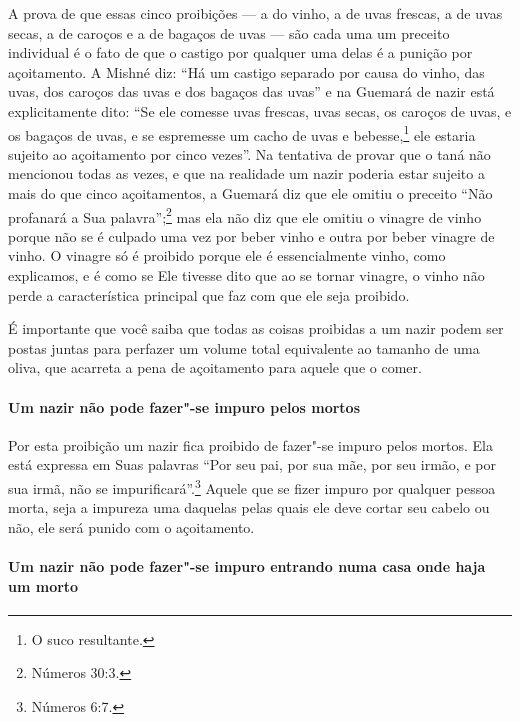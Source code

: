 \begin{multicols}{2}
A prova de que essas cinco proibições --- a do vinho, a de uvas
frescas, a de uvas secas, a de caroços e a de bagaços de uvas --- são
cada uma um preceito individual é o fato de que o castigo por qualquer uma delas é a
punição por açoitamento. A Mishné diz: ``Há um castigo separado por
causa do vinho, das uvas, dos caroços das uvas e dos bagaços das uvas''
e na Guemará\starr{} de nazir\starr{} está explicitamente dito: ``Se ele comesse uvas
frescas, uvas secas, os caroços de uvas, e os bagaços de uvas, e se
espremesse um cacho de uvas e bebesse,\footnote{O suco resultante.} ele estaria
sujeito ao açoitamento por cinco vezes''. Na tentativa de provar que o
taná\starr{} não mencionou todas as vezes, e que na realidade um nazir\starr{}
poderia estar sujeito a mais do que cinco açoitamentos, a Guemará\starr{} diz
que ele omitiu o preceito ``Não profanará a Sua palavra'';\footnote{Números
30:3.} mas ela não diz que ele omitiu o vinagre de vinho porque não se é
culpado uma vez por beber vinho e outra por beber vinagre de vinho. O
vinagre só é proibido porque ele é essencialmente vinho, como
explicamos, e é como se Ele tivesse dito que ao se tornar vinagre, o
vinho não perde a característica principal que faz com que ele seja
proibido.

É importante que você saiba que todas as coisas proibidas a um nazir\starr{}
podem ser postas juntas para perfazer um volume total equivalente ao
tamanho de uma oliva, que acarreta a pena de açoitamento para aquele
que o comer.

\paragraph{Um nazir\starr{} não pode fazer"-se impuro pelos mortos}

Por esta proibição um nazir\starr{} fica proibido de fazer"-se impuro pelos
mortos. Ela está expressa em Suas palavras ``Por seu pai, por sua mãe,
por seu irmão, e por sua irmã, não se impurificará''.\footnote{Números 6:7.}
Aquele que se fizer impuro por qualquer pessoa morta, seja a impureza
uma daquelas pelas quais ele deve cortar seu cabelo ou não, ele será
punido com o açoitamento.

\paragraph{Um nazir\starr{} não pode fazer"-se impuro entrando numa casa onde haja um morto}


\end{multicols}
